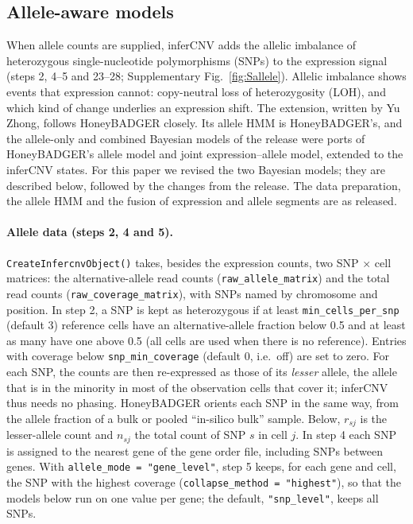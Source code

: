 \subsection*{Allele-aware models}
\label{sec:supp_allele}

When allele counts are supplied, inferCNV adds the allelic imbalance of heterozygous single-nucleotide polymorphisms (SNPs) to the expression signal (steps 2, 4--5 and 23--28; Supplementary Fig.~\ref{fig:Sallele}). Allelic imbalance shows events that expression cannot: copy-neutral loss of heterozygosity (LOH), and which kind of change underlies an expression shift. The extension, written by Yu Zhong, follows HoneyBADGER \citep{fan2018} closely. Its allele HMM is HoneyBADGER's, and the allele-only and combined Bayesian models of the release were ports of HoneyBADGER's allele model and joint expression--allele model, extended to the inferCNV states. For this paper we revised the two Bayesian models; they are described below, followed by the changes from the release. The data preparation, the allele HMM and the fusion of expression and allele segments are as released.

\paragraph{Allele data (steps 2, 4 and 5).}
\texttt{CreateInfercnvObject()} takes, besides the expression counts, two SNP $\times$ cell matrices: the alternative-allele read counts (\texttt{raw\_allele\_matrix}) and the total read counts (\texttt{raw\_coverage\_matrix}), with SNPs named by chromosome and position. In step 2, a SNP is kept as heterozygous if at least \texttt{min\_cells\_per\_snp} (default 3) reference cells have an alternative-allele fraction below 0.5 and at least as many have one above 0.5 (all cells are used when there is no reference). Entries with coverage below \texttt{snp\_min\_coverage} (default 0, i.e.\ off) are set to zero. For each SNP, the counts are then re-expressed as those of its \emph{lesser} allele, the allele that is in the minority in most of the observation cells that cover it; inferCNV thus needs no phasing. HoneyBADGER orients each SNP in the same way, from the allele fraction of a bulk or pooled ``in-silico bulk'' sample. Below, $r_{sj}$ is the lesser-allele count and $n_{sj}$ the total count of SNP $s$ in cell $j$. In step 4 each SNP is assigned to the nearest gene of the gene order file, including SNPs between genes. With \texttt{allele\_mode = "gene\_level"}, step 5 keeps, for each gene and cell, the SNP with the highest coverage (\texttt{collapse\_method = "highest"}), so that the models below run on one value per gene; the default, \texttt{"snp\_level"}, keeps all SNPs.

